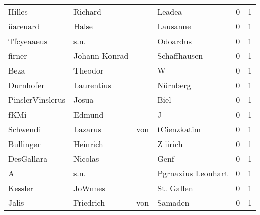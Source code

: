 \documentclass[10pt,a4paper,landscape]{article}
\begin{document}
\begin{longtable}{llllrr}
                   Hilles &                            Richard &             &                                      Leadea &          0 &         1 \\
                 üareuard &                              Halse &             &                                    Lausanne &          0 &         1 \\
               Tfcyeaaeus &                               s.n. &             &                                    Odoardus &          0 &         1 \\
                   firner &                      Johann Konrad &             &                                Schaffhausen &          0 &         1 \\
                     Beza &                            Theodor &             &                                           W &          0 &         1 \\
                Durnhofer &                         Laurentius &             &                                    Nürnberg &          0 &         1 \\
         PinslerVinslerus &                              Josua &             &                                        Biel &          0 &         1 \\
                     fKMi &                             Edmund &             &                                           J &          0 &         1 \\
                 Schwendi &                            Lazarus &         von &                                 tCienzkatim &          0 &         1 \\
                Bullinger &                           Heinrich &             &                                    Z iirich &          0 &         1 \\
               DesGallara &                            Nicolas &             &                                        Genf &          0 &         1 \\
                        A &                               s.n. &             &                          Pgrnaxius Leonhart &          0 &         1 \\
                  Kessler &                            JoWnnes &             &                                  St. Gallen &          0 &         1 \\
                    Jalis &                          Friedrich &         von &                                     Samaden &          0 &         1 \\

\end{longtable}
\end{document}
